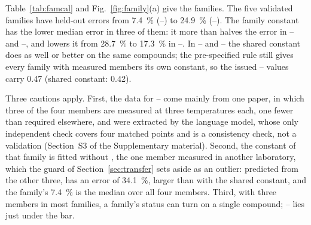 Table~\ref{tab:famcal} and Fig.~\ref{fig:family}(a) give the families. The five validated families
have held-out errors from \SI{7.4}{\percent} (--) to \SI{24.9}{\percent}
(--). The family constant has the lower median error in three of them: it more than halves the error in -- and --, and lowers it from
\SI{28.7}{\percent} to \SI{17.3}{\percent} in --.
In -- and -- the shared constant does as well or better on the same
compounds; the pre-specified rule still gives every family with measured members its own constant,
so the issued -- values carry \num{0.47} (shared constant: \num{0.42}).

Three cautions apply. First, the data for -- come mainly from one paper, in which
three of the four members are measured at three temperatures each, one fewer than required
elsewhere, and were extracted by the language model, whose only independent check covers four
matched points and is a consistency check, not a validation (Section~S3 of the Supplementary
material). Second, the constant of that family is fitted without , the one member measured
in another laboratory, which the guard of Section~\ref{sec:transfer} sets aside as an outlier:
predicted from the other three,  has an error of \SI{34.1}{\percent}, larger than with the
shared constant, and the family's \SI{7.4}{\percent} is the median over all four members. Third,
with three members in most families, a family's status can turn on a single compound;
-- lies just under the bar.

